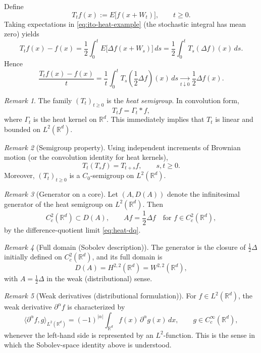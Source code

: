 \documentclass[11pt]{article}
\theoremstyle{definition}
\theoremstyle{remark}
\newtheorem{remark}{Remark}
\begin{document}
Define
\[
    T_t f(x) := E\bigl[f(x+W_t)\bigr],
    \qquad t\ge 0.
\]
Taking expectations in \eqref{eq:ito-heat-example} (the stochastic integral has mean zero) yields
\[
    T_t f(x) - f(x)
    =
    \frac12 \int_0^t E\bigl[\Delta f(x+W_s)\bigr]\,ds
    =
    \frac12 \int_0^t T_s(\Delta f)(x)\,ds.
\]
Hence
\begin{equation}\label{eq:heat-dq}
    \frac{T_t f(x)-f(x)}{t}
    =
    \frac1t \int_0^t T_s\!\left(\frac12\Delta f\right)(x)\,ds
    \xrightarrow[t\downarrow 0]{}
    \frac12\Delta f(x).
\end{equation}

\begin{remark}
The family $(T_t)_{t\ge 0}$ is the \emph{heat semigroup}. In convolution form,
\[
    T_t f = \Gamma_t * f,
\]
where $\Gamma_t$ is the heat kernel on $\mathbb{R}^d$.
This immediately implies that $T_t$ is linear and bounded on $L^2(\mathbb{R}^d)$.
\end{remark}

\begin{remark}[Semigroup property]
Using independent increments of Brownian motion (or the convolution identity for heat kernels),
\[
    T_t(T_s f)=T_{t+s}f,
    \qquad s,t\ge 0.
\]
Moreover, $(T_t)_{t\ge 0}$ is a $C_0$-semigroup on $L^2(\mathbb{R}^d)$.
\end{remark}

\begin{remark}[Generator on a core]
Let $(A,D(A))$ denote the infinitesimal generator of the heat semigroup on $L^2(\mathbb{R}^d)$.
Then
\[
    C_c^2(\mathbb{R}^d) \subset D(A),
    \qquad
    Af = \frac12 \Delta f
    \quad \text{for } f\in C_c^2(\mathbb{R}^d),
\]
by the difference-quotient limit \eqref{eq:heat-dq}.
\end{remark}

\begin{remark}[Full domain (Sobolev description)]
The generator is the closure of $\frac12\Delta$ initially defined on $C_c^2(\mathbb{R}^d)$, and its full domain is
\[
    D(A)=H^{2,2}(\mathbb{R}^d)=W^{2,2}(\mathbb{R}^d),
\]
with $A=\frac12\Delta$ in the weak (distributional) sense.
\end{remark}

\begin{remark}[Weak derivatives (distributional formulation)]
For $f \in L^2(\mathbb{R}^d)$, the weak derivative $\partial^\alpha f$ is characterized by
\[
    \langle \partial^\alpha f, g\rangle_{L^2(\mathbb{R}^d)}
    =
    (-1)^{|\alpha|}
    \int_{\mathbb{R}^d} f(x)\,\partial^\alpha g(x)\,dx,
    \qquad g\in C_c^\infty(\mathbb{R}^d),
\]
whenever the left-hand side is represented by an $L^2$-function.
This is the sense in which the Sobolev-space identity above is understood.
\end{remark}
\end{document}
